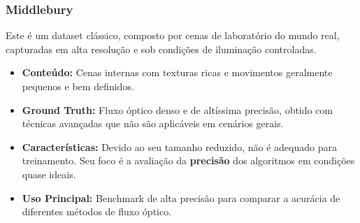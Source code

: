\documentclass[12pt, a4paper]{article}
\begin{document}
\subsubsection{Middlebury}
Este é um dataset clássico, composto por cenas de laboratório do mundo real, capturadas em alta resolução e sob condições de iluminação controladas.
\begin{itemize}
    \item \textbf{Conteúdo:} Cenas internas com texturas ricas e movimentos geralmente pequenos e bem definidos.
    \item \textbf{Ground Truth:} Fluxo óptico denso e de altíssima precisão, obtido com técnicas avançadas que não são aplicáveis em cenários gerais.
    \item \textbf{Características:} Devido ao seu tamanho reduzido, não é adequado para treinamento. Seu foco é a avaliação da \textbf{precisão} dos algoritmos em condições quase ideais.
    \item \textbf{Uso Principal:} Benchmark de alta precisão para comparar a acurácia de diferentes métodos de fluxo óptico.
\end{itemize}





\end{document}
